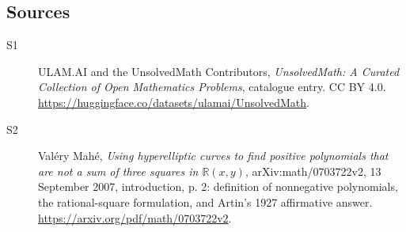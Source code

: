 \documentclass[11pt]{article}
\begin{document}
\subsection{Sources}
\begin{description}
\item[\hypertarget{source:statement:1}{S1}] ULAM.AI and the UnsolvedMath Contributors, \emph{UnsolvedMath: A Curated Collection of Open Mathematics Problems}, catalogue entry. CC BY 4.0. \url{https://huggingface.co/datasets/ulamai/UnsolvedMath}.
\item[\hypertarget{source:statement:2}{S2}] Valéry Mahé, \emph{Using hyperelliptic curves to find positive polynomials that are not a sum of three squares in $\mathbb R(x,y)$}, arXiv:math/0703722v2, 13 September 2007, introduction, p. 2: definition of nonnegative polynomials, the rational-square formulation, and Artin's 1927 affirmative answer. \url{https://arxiv.org/pdf/math/0703722v2}.
\end{description}
\label{end:statement}
\end{document}

